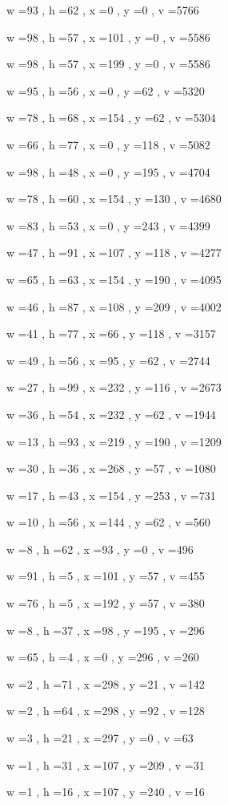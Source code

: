 \documentclass[11pt]{article}
\begin{document}
w =93 , h =62 , x =0 , y =0 , v =5766
\par
w =98 , h =57 , x =101 , y =0 , v =5586
\par
w =98 , h =57 , x =199 , y =0 , v =5586
\par
w =95 , h =56 , x =0 , y =62 , v =5320
\par
w =78 , h =68 , x =154 , y =62 , v =5304
\par
w =66 , h =77 , x =0 , y =118 , v =5082
\par
w =98 , h =48 , x =0 , y =195 , v =4704
\par
w =78 , h =60 , x =154 , y =130 , v =4680
\par
w =83 , h =53 , x =0 , y =243 , v =4399
\par
w =47 , h =91 , x =107 , y =118 , v =4277
\par
w =65 , h =63 , x =154 , y =190 , v =4095
\par
w =46 , h =87 , x =108 , y =209 , v =4002
\par
w =41 , h =77 , x =66 , y =118 , v =3157
\par
w =49 , h =56 , x =95 , y =62 , v =2744
\par
w =27 , h =99 , x =232 , y =116 , v =2673
\par
w =36 , h =54 , x =232 , y =62 , v =1944
\par
w =13 , h =93 , x =219 , y =190 , v =1209
\par
w =30 , h =36 , x =268 , y =57 , v =1080
\par
w =17 , h =43 , x =154 , y =253 , v =731
\par
w =10 , h =56 , x =144 , y =62 , v =560
\par
w =8 , h =62 , x =93 , y =0 , v =496
\par
w =91 , h =5 , x =101 , y =57 , v =455
\par
w =76 , h =5 , x =192 , y =57 , v =380
\par
w =8 , h =37 , x =98 , y =195 , v =296
\par
w =65 , h =4 , x =0 , y =296 , v =260
\par
w =2 , h =71 , x =298 , y =21 , v =142
\par
w =2 , h =64 , x =298 , y =92 , v =128
\par
w =3 , h =21 , x =297 , y =0 , v =63
\par
w =1 , h =31 , x =107 , y =209 , v =31
\par
w =1 , h =16 , x =107 , y =240 , v =16
\par
\newpage
\end{document}
